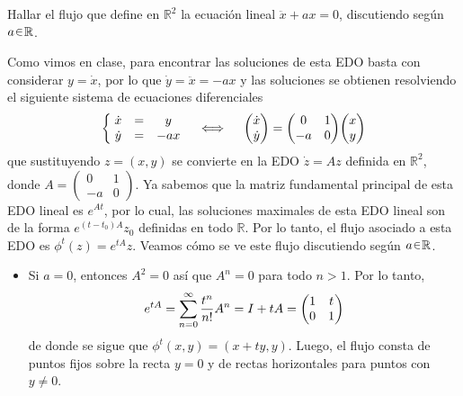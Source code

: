 \begin{ejer}
Hallar el flujo que define en $\mathbb{R}^2$ la ecuación lineal $\ddot{x} + ax = 0$, 
discutiendo según $a \en \mathbb{R}$. 
\end{ejer}
\begin{sol}
Como vimos en clase, para encontrar las soluciones de esta EDO basta con considerar $y = \dot{x}$, por lo que $\dot{y} = \ddot{x} = -ax$ y las soluciones se obtienen resolviendo el siguiente sistema de ecuaciones diferenciales 
\[
\left\{\;%
\begin{matrix}
   \dot{x} &=& y \\
   \dot{y} &=& -ax
\end{matrix}
\right.%
\quad\iff\quad
\mqty(\dot{x}\\\dot{y})%
=
\mqty(
    0 & 1\\
   -a & 0
)
\mqty(x \\ y)
\]
que sustituyendo $z = (x, y)$ se convierte en la EDO $\dot{z} = Az$ definida en $\mathbb{R}^2$, donde $A = \left(\begin{smallmatrix}0&1\\-a&0\end{smallmatrix}\right)$. Ya sabemos que la matriz fundamental principal de esta EDO lineal es $e^{At}$, por lo cual, las soluciones maximales de esta EDO lineal son de la forma $e^{(t-t_0)A}z_0$ definidas en todo $\mathbb{R}$. Por lo tanto, el flujo asociado a esta EDO es $\phi^t(z) = e^{tA}z$. Veamos cómo se ve este flujo discutiendo según $a \en \mathbb{R}$.

\begin{itemize}
    \item Si $a=0$, entonces $A^2 = 0$ así que $A^n = 0$ para todo $n > 1$. Por lo tanto, 
    \[
    e^{tA}%
    = \sum^\infty_{n=0} \frac{t^n}{n!}A^n%
    = I + tA%
    = \mqty(1 & t \\ 0 & 1)
    \]
    de donde se sigue que $\phi^t(x,y)=
    (x+ty, y)$. Luego, el flujo consta de puntos fijos sobre la recta $y=0$ y de rectas horizontales para puntos con $y \neq 0$.\par
    \begin{center}
\end{center}
\end{itemize}
\end{sol}
